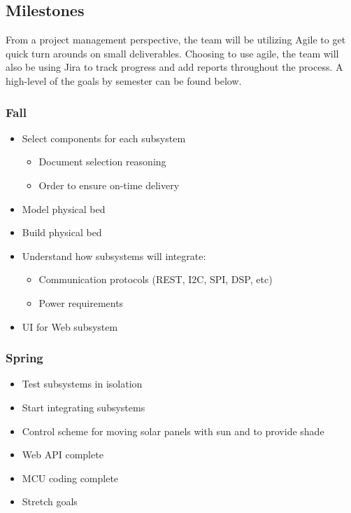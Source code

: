 \subsection{Milestones}
From a project management perspective, the team will be utilizing Agile to get quick turn arounds on small deliverables. Choosing to use agile, the team will also be using Jira to track progress and add reports throughout the process. A high-level of the goals by semester can be found below.
\subsubsection{Fall}
\begin{itemize}
    \item Select components for each subsystem
    \begin{itemize}
        \item Document selection reasoning
        \item Order to ensure on-time delivery
    \end{itemize}
    \item Model physical bed
    \item Build physical bed
    \item Understand how subsystems will integrate:
    \begin{itemize}
        \item Communication protocols (REST, I2C, SPI, DSP, etc)
        \item Power requirements
    \end{itemize}
    \item UI for Web subsystem
\end{itemize}
\subsubsection{Spring}
\begin{itemize}
    \item Test subsystems in isolation
    \item Start integrating subsystems
    \item Control scheme for moving solar panels with sun and to provide shade
    \item Web API complete
    \item MCU coding complete
    \item Stretch goals
\end{itemize}